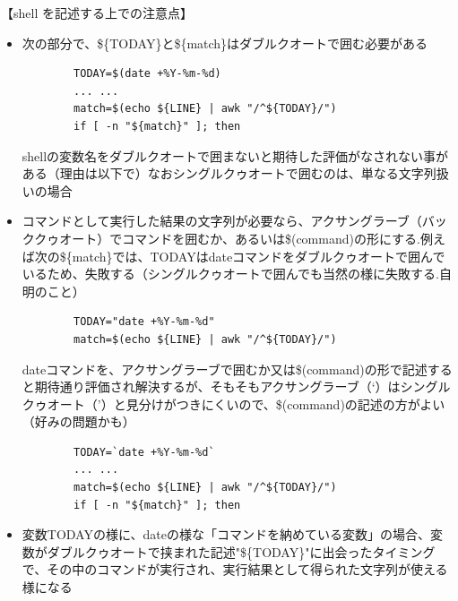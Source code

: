 \documentclass[12pt,a4paper,uplatex]{jsarticle}
\begin{document}
\newpage

【shell を記述する上での注意点】

\begin{itemize}
	\item 次の部分で、\$\{TODAY\}と\$\{match\}はダブルクオートで囲む必要がある	
	\begin{verbatim}
		TODAY=$(date +%Y-%m-%d)
		... ...
		match=$(echo ${LINE} | awk "/^${TODAY}/")
		if [ -n "${match}" ]; then
	\end{verbatim}
	shellの変数名をダブルクオートで囲まないと期待した評価がなされない事がある（理由は以下で）なおシングルクゥオートで囲むのは、単なる文字列扱いの場合
	\item コマンドとして実行した結果の文字列が必要なら、アクサングラーブ（バッククゥオート）でコマンドを囲むか、あるいは\$(command)の形にする.例えば次の\$\{match\}では、TODAYはdateコマンドをダブルクゥオートで囲んでいるため、失敗する（シングルクゥオートで囲んでも当然の様に失敗する.自明のこと）
	\begin{verbatim}
		TODAY="date +%Y-%m-%d"
		match=$(echo ${LINE} | awk "/^${TODAY}/")
	\end{verbatim}
	dateコマンドを、アクサングラーブで囲むか又は\$(command)の形で記述すると期待通り評価され解決するが、そもそもアクサングラーブ（`）はシングルクゥオート（'）と見分けがつきにくいので、\$(command)の記述の方がよい（好みの問題かも）
	\begin{verbatim}
		TODAY=`date +%Y-%m-%d`
		... ...
		match=$(echo ${LINE} | awk "/^${TODAY}/")
		if [ -n "${match}" ]; then
	\end{verbatim}
	\item 変数TODAYの様に、dateの様な「コマンドを納めている変数」の場合、変数がダブルクゥオートで挟まれた記述"\$\{TODAY\}"に出会ったタイミングで、その中のコマンドが実行され、実行結果として得られた文字列が使える様になる
	

\end{itemize}
\end{document}
